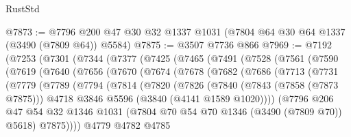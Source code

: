 \begin{lexlean}{RustStd}
\begin{coremodule}
@7873 := @7796 @200 @47 @30 @32 @1337 @1031 (@7804 @64 @30 @64 @1337 (@3490 (@7809 @64)) @5584)
@7875 := @3507 @7736 @866
@7969 := @7192
    (@7253
      (@7301
        (@7344
          (@7377
            (@7425
              (@7465
                (@7491
                  (@7528
                    (@7561
                      (@7590
                        (@7619
                          (@7640
                            (@7656
                              (@7670
                                (@7674
                                  (@7678
                                    (@7682
                                      (@7686
                                        (@7713
                                          (@7731
                                            (@7779
                                              (@7789
                                                (@7794
                                                  (@7814
                                                    (@7820
                                                      (@7826
                                                        (@7840
                                                          (@7843 (@7858 (@7873 @7875)))
                                                          @4718
                                                          @3846
                                                          @5596
                                                          (@3840 (@4141 @1589 @1020))))
                                                      (@7796
                                                        @206
                                                        @47
                                                        @54
                                                        @32
                                                        @1346
                                                        @1031
                                                        (@7804
                                                          @70
                                                          @54
                                                          @70
                                                          @1346
                                                          (@3490 (@7809 @70))
                                                          @5618)
                                                        @7875))))
                                                @4779
                                                @4782
                                                @4785

\end{coremodule}
\end{lexlean}
